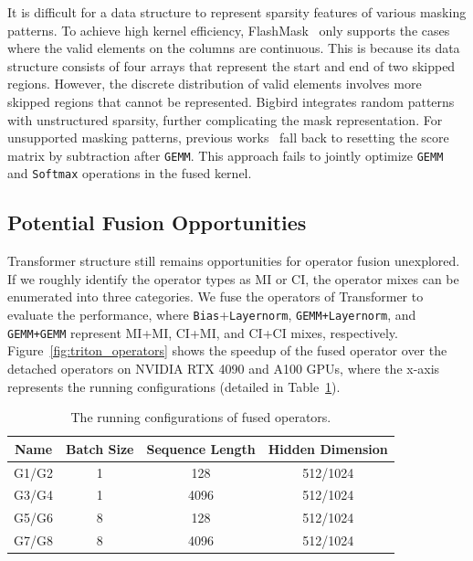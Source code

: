It is difficult for a data structure to represent sparsity features of various masking patterns. To achieve high kernel efficiency, FlashMask~\cite{wang2024flashmask} only supports the cases where the valid elements on the columns are continuous. This is because its data structure consists of four arrays that represent the start and end of two skipped regions. However, the discrete distribution of valid elements involves more skipped regions that cannot be represented. Bigbird integrates random patterns with unstructured sparsity, further complicating the mask representation. For unsupported masking patterns, previous works~\cite{zhai2023bytetransformer,dong2024flex} fall back to resetting the score matrix by subtraction after \texttt{GEMM}. This approach fails to jointly optimize \texttt{GEMM} and \texttt{Softmax} operations in the fused kernel.



\subsection{Potential Fusion Opportunities}
\label{sec:atuo-fusion}


Transformer structure still remains opportunities for operator fusion unexplored. If we roughly identify the operator types as MI or CI, the operator mixes can be enumerated into three categories. We fuse the operators of Transformer to evaluate the performance, where \texttt{Bias}+\texttt{Layernorm}, \texttt{GEMM+Layernorm}, and \texttt{GEMM+GEMM} represent MI+MI, CI+MI, and CI+CI mixes, respectively. Figure~\ref{fig:triton_operators} shows the speedup of the fused operator over the detached operators on NVIDIA RTX 4090 and A100 GPUs, where the x-axis represents the running configurations (detailed in Table~\ref{tab:moti_B_Config}).


\begin{table}[htbp]
  \small
  \centering
  \caption{The running configurations of fused operators.}
  \begin{tabular}{c || c | c | c }
    \hline
    Name & Batch Size & Sequence Length & Hidden Dimension \\
    \hline   \hline
    G1/G2 & 1 & 128 & 512/1024 \\  \hline
    G3/G4 & 1 & 4096 & 512/1024 \\ \hline
    G5/G6 & 8 & 128 & 512/1024 \\  \hline
    G7/G8 & 8 & 4096 & 512/1024 \\ \hline
  \end{tabular}%
\label{tab:moti_B_Config}
\end{table}

